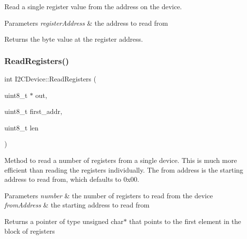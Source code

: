 Read a single register value from the address on the device. 
\begin{DoxyParams}{Parameters}
{\em register\+Address} & the address to read from \\
\hline
\end{DoxyParams}
\begin{DoxyReturn}{Returns}
the byte value at the register address. 
\end{DoxyReturn}
\mbox{\label{classcubesat_1_1I2CDevice_ade46491355547ba50c00a078527dff93}} 
\subsubsection{\texorpdfstring{Read\+Registers()}{ReadRegisters()}}
{\footnotesize\ttfamily int I2\+C\+Device\+::\+Read\+Registers (\begin{DoxyParamCaption}\item[{uint8\+\_\+t $\ast$}]{out,  }\item[{uint8\+\_\+t}]{first\+\_\+addr,  }\item[{uint8\+\_\+t}]{len }\end{DoxyParamCaption})\hspace{0.3cm}{\ttfamily [virtual]}}

Method to read a number of registers from a single device. This is much more efficient than reading the registers individually. The from address is the starting address to read from, which defaults to 0x00. 
\begin{DoxyParams}{Parameters}
{\em number} & the number of registers to read from the device \\
\hline
{\em from\+Address} & the starting address to read from \\
\hline
\end{DoxyParams}
\begin{DoxyReturn}{Returns}
a pointer of type unsigned char$\ast$ that points to the first element in the block of registers 
\end{DoxyReturn}
\mbox{\label{classcubesat_1_1I2CDevice_a4c961bc762deb1388a541f148de32b7e}} 
